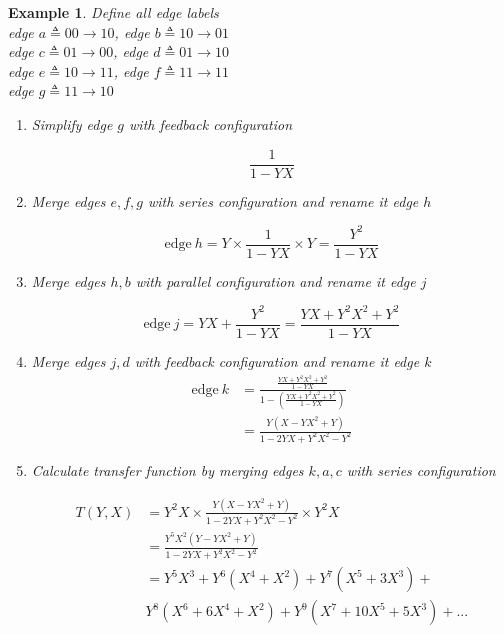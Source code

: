 \documentclass[fontsize=12pt]{article}
\newtheorem{example}[theorem]{Example}
\begin{document}
\begin{example} Define all edge labels\\
\label{ex3}
 edge $ a\triangleq 0 0 \rightarrow 1 0$,  edge $b \triangleq 1 0 \rightarrow 0 1$\\
 edge $ c \triangleq 0 1 \rightarrow 0 0$, edge $d \triangleq 0 1 \rightarrow 1 0$\\
 edge $ e \triangleq 1 0 \rightarrow 1 1$, edge $f \triangleq 1 1 \rightarrow 1 1$\\
 edge $ g \triangleq 1 1 \rightarrow 1 0$

\begin{enumerate}
\item Simplify edge $g$ with feedback configuration

$$ \frac{1}{1-YX}$$

\item Merge edges $e,f,g$ with series configuration and rename it edge $h$

$$\text{edge}~h = Y\times \frac{1}{1-YX}\times Y=\frac{Y^2}{1-YX}$$

\item Merge edges $h,b$ with parallel configuration and rename it edge $j$

$$\text{edge}~j = YX+ \frac{Y^2}{1-YX}= \frac{YX+Y^2X^2+Y^2}{1-YX}$$

\item Merge  edges $j,d$ with feedback configuration and rename it edge $k$ 
\begin{equation*}
\begin{split}
 \text{edge}~k&= \frac{\frac{YX+Y^2X^2+Y^2}{1-YX}}{1-(\frac{YX+Y^2X^2+Y^2}{1-YX})}\\
 &=\frac{Y(X-YX^2+Y)}{1-2YX+Y^2X^2-Y^2}
\end{split}
\end{equation*}

\item Calculate transfer function by merging edges $k,a,c$ with series configuration

\begin{equation*}
\begin{split}
T(Y,X)&=Y^2X \times \frac{Y(X-YX^2+Y)}{1-2YX+Y^2X^2-Y^2}\times Y^2X \\
&=\frac{Y^5X^2(Y-YX^2+Y)}{1-2YX+Y^2X^2-Y^2}\\
&=Y^5X^3+Y^6(X^4+X^2)+Y^7(X^5+3X^3)+\\
&Y^8(X^6+6X^4+X^2)+Y^9(X^7+10X^5+5X^3)+...
\end{split}
\end{equation*}
\end{enumerate}
\end{example}
\end{document}
